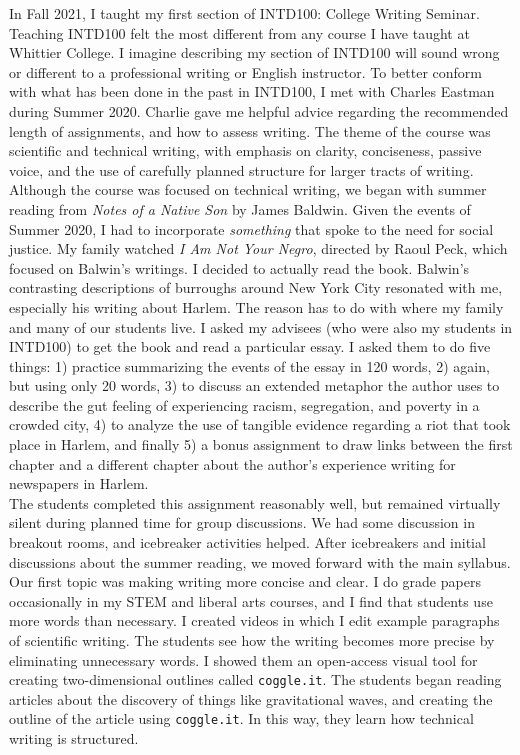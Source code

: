 \documentclass[../../../main.tex]{subfiles}
\begin{document}
In Fall 2021, I taught my first section of INTD100: College Writing Seminar.  Teaching INTD100 felt the most different from any course I have taught at Whittier College.  I imagine describing my section of INTD100 will sound wrong or different to a professional writing or English instructor.  To better conform with what has been done in the past in INTD100, I met with Charles Eastman during Summer 2020.  Charlie gave me helpful advice regarding the recommended length of assignments, and how to assess writing.  The theme of the course was scientific and technical writing, with emphasis on clarity, conciseness, passive voice, and the use of carefully planned structure for larger tracts of writing.
\\
\vspace{0.15cm}
Although the course was focused on technical writing, we began with summer reading from \textit{Notes of a Native Son} by James Baldwin.  Given the events of Summer 2020, I had to incorporate \textit{something} that spoke to the need for social justice.  My family watched \textit{I Am Not Your Negro}, directed by Raoul Peck, which focused on Balwin's writings.  I decided to actually read the book.  Balwin's contrasting descriptions of burroughs around New York City resonated with me, especially his writing about Harlem.  The reason has to do with where my family and many of our students live.  I asked my advisees (who were also my students in INTD100) to get the book and read a particular essay.  I asked them to do five things: 1) practice summarizing the events of the essay in 120 words, 2) again, but using only 20 words, 3) to discuss an extended metaphor the author uses to describe the gut feeling of experiencing racism, segregation, and poverty in a crowded city, 4) to analyze the use of tangible evidence regarding a riot that took place in Harlem, and finally 5) a bonus assignment to draw links between the first chapter and a different chapter about the author's experience writing for newspapers in Harlem.
\\
\vspace{0.15cm}
The students completed this assignment reasonably well, but remained virtually silent during planned time for group discussions.  We had some discussion in breakout rooms, and icebreaker activities helped.  After icebreakers and initial discussions about the summer reading, we moved forward with the main syllabus.  Our first topic was making writing more concise and clear.  I do grade papers occasionally in my STEM and liberal arts courses, and I find that students use more words than necessary.  I created videos in which I edit example paragraphs of scientific writing.  The students see how the writing becomes more precise by eliminating unnecessary words.  I showed them an open-access visual tool for creating two-dimensional outlines called \verb+coggle.it+.  The students began reading articles about the discovery of things like gravitational waves, and creating the outline of the article using \verb+coggle.it+.  In this way, they learn how technical writing is structured.
\end{document}
